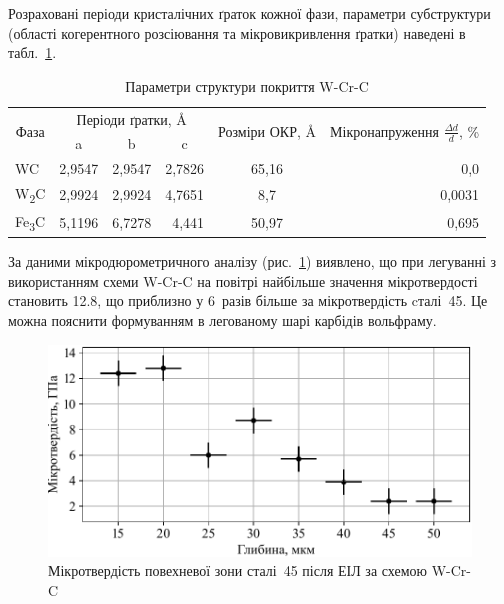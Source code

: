 \documentclass[a4paper,fontsize=14bp,ukrainian]{extreport}
\begin{document}
Розраховані періоди кристалічних ґраток кожної фази, параметри субструктури (області когерентного розсіювання та мікровикривлення ґратки) наведені в табл.~\ref{tab:structure_W-Cr-C}.

\begin{table}[H]
\centering
\caption{Параметри структури покриття W-Cr-C}
\label{tab:structure_W-Cr-C}
\begin{tabular}{|l|r|r|r|c|r|}
\hline
\multicolumn{1}{|c|}{\multirow{2}{*}{Фаза}} & \multicolumn{3}{c|}{Періоди ґратки, \AA} & \multicolumn{1}{c|}{\multirow{2}{*}{Розміри ОКР, \AA}} & \multicolumn{1}{c|}{\multirow{2}{*}{Мікронапруження  $\frac{\Delta d}{d}$, \%}} \\ \cline{2-4}
\multicolumn{1}{|c|}{} & \multicolumn{1}{c|}{a} & \multicolumn{1}{c|}{b} & \multicolumn{1}{c|}{c} & \multicolumn{1}{c|}{} & \multicolumn{1}{c|}{} \\ \hline

WC & 2,9547 & 2,9547 & 2,7826 & 65,16 & 0,0 \\ \hline
W\textsubscript{2}C & 2,9924 & 2,9924 & 4,7651 & 8,7 & 0,0031 \\ \hline
Fe\textsubscript{3}C & 5,1196 & 6,7278 & 4,441 & 50,97 & 0,695 \\ \hline

\end{tabular}
\end{table}

За даними мікродюрометричного аналізу (рис.~\ref{fig:plt_hard_W-Cr-C}) виявлено, що при легуванні з використанням схеми W-Cr-C на повітрі найбільше значення мікротвердості становить \SI{12.8}{\gpa}, що приблизно у 6~разів більше за мікротвердість cталі~45. Це можна пояснити формуванням в легованому шарі карбідів вольфраму.

\begin{figure}[H]
\centering
\includegraphics[]{plt_hard_W-Cr-C.pdf}
\caption{Мікротвердість повехневої зони сталі~45 після ЕІЛ за схемою W-Cr-C}
\label{fig:plt_hard_W-Cr-C}
\end{figure}
\end{document}
